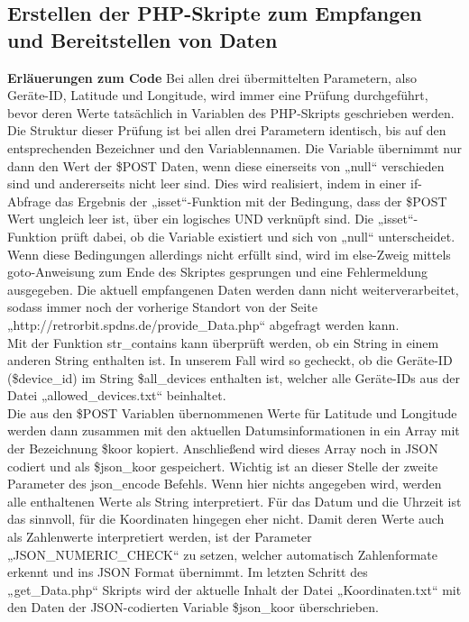 \subsection{Erstellen der PHP-Skripte zum Empfangen und Bereitstellen von Daten}
\textbf{Erläuerungen zum Code }Bei allen drei übermittelten Parametern, also Geräte-ID, Latitude und Longitude, wird immer eine Prüfung durchgeführt, bevor deren Werte tatsächlich in Variablen des PHP-Skripts geschrieben werden. Die Struktur dieser Prüfung ist bei allen drei Parametern identisch, bis auf den entsprechenden Bezeichner und den Variablennamen.
Die Variable übernimmt nur dann den Wert der \$POST Daten, wenn diese einerseits von „null“ verschieden sind und andererseits nicht leer sind. Dies wird realisiert, indem in einer if-Abfrage das Ergebnis der „isset“-Funktion mit der Bedingung, dass der \$POST Wert ungleich leer ist, über ein logisches UND verknüpft sind. Die „isset“-Funktion prüft dabei, ob die Variable existiert und sich von „null“ unterscheidet. Wenn diese Bedingungen allerdings nicht erfüllt sind, wird im else-Zweig mittels goto-Anweisung zum Ende des Skriptes gesprungen und eine Fehlermeldung ausgegeben. Die aktuell empfangenen Daten werden dann nicht weiterverarbeitet, sodass immer noch der vorherige Standort von der Seite „http://retrorbit.spdns.de/provide\_Data.php“ abgefragt werden kann.
\\
Mit der Funktion str\_contains kann überprüft werden, ob ein String in einem anderen String enthalten ist. In unserem Fall wird so gecheckt, ob die Geräte-ID (\$device\_id) im String \$all\_devices enthalten ist, welcher alle Geräte-IDs aus der Datei „allowed\_devices.txt“ beinhaltet.
\\
Die aus den \$POST Variablen übernommenen Werte für Latitude und Longitude werden dann zusammen mit den aktuellen Datumsinformationen in ein Array mit der Bezeichnung \$koor kopiert. Anschließend wird dieses Array noch in JSON codiert und als \$json\_koor gespeichert. Wichtig ist an dieser Stelle der zweite Parameter des json\_encode Befehls. Wenn hier nichts angegeben wird, werden alle enthaltenen Werte als String interpretiert. Für das Datum und die Uhrzeit ist das sinnvoll, für die Koordinaten hingegen eher nicht. Damit deren Werte auch als Zahlenwerte interpretiert werden, ist der Parameter „JSON\_NUMERIC\_CHECK“ zu setzen, welcher automatisch Zahlenformate erkennt und ins JSON Format übernimmt. Im letzten Schritt des „get\_Data.php“ Skripts wird der aktuelle Inhalt der Datei „Koordinaten.txt“ mit den Daten der JSON-codierten Variable \$json\_koor überschrieben.
